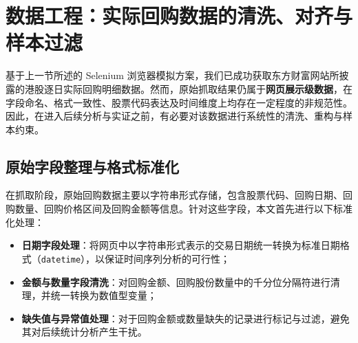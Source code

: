 \documentclass[a4paper,10pt]{article}
\begin{document}



\section{数据工程：实际回购数据的清洗、对齐与样本过滤}

基于上一节所述的 Selenium 浏览器模拟方案，我们已成功获取东方财富网站所披露的港股逐日实际回购明细数据。然而，原始抓取结果仍属于\textbf{网页展示级数据}，在字段命名、格式一致性、股票代码表达及时间维度上均存在一定程度的非规范性。因此，在进入后续分析与实证之前，有必要对该数据进行系统性的清洗、重构与样本约束。

\subsection{原始字段整理与格式标准化}

在抓取阶段，原始回购数据主要以字符串形式存储，包含股票代码、回购日期、回购数量、回购价格区间及回购金额等信息。针对这些字段，本文首先进行以下标准化处理：

\begin{itemize}
    \item \textbf{日期字段处理}：将网页中以字符串形式表示的交易日期统一转换为标准日期格式（\texttt{datetime}），以保证时间序列分析的可行性；
    \item \textbf{金额与数量字段清洗}：对回购金额、回购股份数量中的千分位分隔符进行清理，并统一转换为数值型变量；
    \item \textbf{缺失值与异常值处理}：对于回购金额或数量缺失的记录进行标记与过滤，避免其对后续统计分析产生干扰。
\end{itemize}
\end{document}
